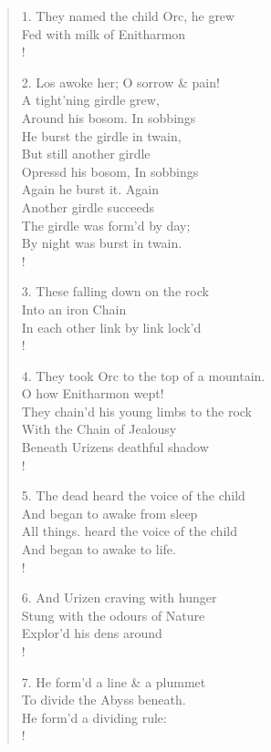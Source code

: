 \documentclass[9pt]{extarticle}
\begin{document}
\begin{verse}
\begin{altverse} 
		
		1. They named the child Orc, he grew\\
		Fed with milk of Enitharmon\\!
		
		2. Los awoke her; O sorrow \& pain!\\
		A tight'ning girdle grew,\\
		Around his bosom. In sobbings\\
		He burst the girdle in twain,\\
		But still another girdle\\
		Opressd his bosom, In sobbings\\
		Again he burst it. Again\\
		Another girdle succeeds\\
		The girdle was form'd by day;\\
		By night was burst in twain.\\!
		
		3. These falling down on the rock\\
		Into an iron Chain\\
		In each other link by link lock'd\\!
		
		4. They took Orc to the top of a mountain.\\
		O how Enitharmon wept!\\
		They chain'd his young limbs to the rock\\
		With the Chain of Jealousy\\
		Beneath Urizens deathful shadow\\!
		
		5. The dead heard the voice of the child\\
		And began to awake from sleep\\
		All things. heard the voice of the child\\
		And began to awake to life.\\!
		
		6. And Urizen craving with hunger\\
		Stung with the odours of Nature\\
		Explor'd his dens around\\!
		
		7. He form'd a line \& a plummet\\
		To divide the Abyss beneath.\\
		He form'd a dividing rule:\\!
		

\end{altverse}
\end{verse}
\end{document}
